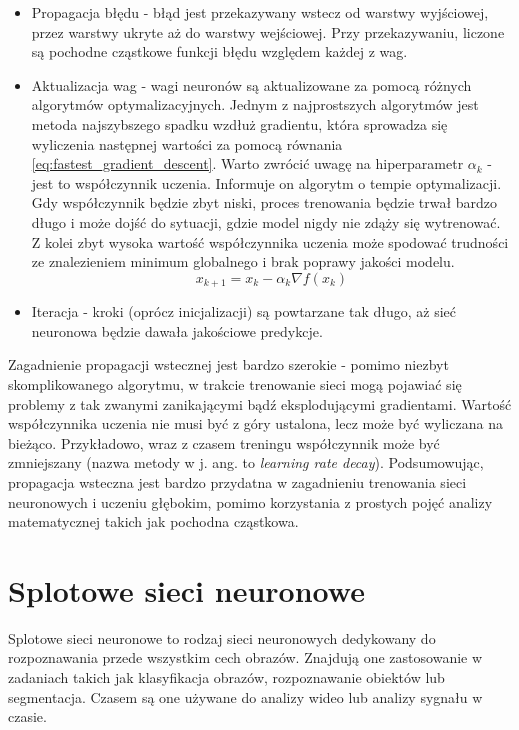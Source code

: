 \begin{itemize}
    \item Propagacja błędu - błąd jest przekazywany wstecz od warstwy wyjściowej, przez warstwy ukryte aż do warstwy wejściowej.
    Przy przekazywaniu, liczone są pochodne cząstkowe funkcji błędu względem każdej z wag.
    \item Aktualizacja wag - wagi neuronów są aktualizowane za pomocą różnych algorytmów optymalizacyjnych.
    Jednym z najprostszych algorytmów jest metoda najszybszego spadku wzdłuż gradientu, która sprowadza się wyliczenia następnej wartości za pomocą równania \ref{eq:fastest_gradient_descent}.
    Warto zwrócić uwagę na hiperparametr $\alpha_k$ - jest to współczynnik uczenia.
    Informuje on algorytm o tempie optymalizacji.
    Gdy współczynnik będzie zbyt niski, proces trenowania będzie trwał bardzo długo i może dojść do sytuacji, gdzie model nigdy nie zdąży się wytrenować.
    Z kolei zbyt wysoka wartość współczynnika uczenia może spodować trudności ze znalezieniem minimum globalnego i brak poprawy jakości modelu.
    \begin{equation}
        x_{k+1} = x_k - \alpha_k \nabla f(x_k)\label{eq:fastest_gradient_descent}
    \end{equation}
    \item Iteracja - kroki (oprócz inicjalizacji) są powtarzane tak długo, aż sieć neuronowa będzie dawała jakościowe predykcje.
\end{itemize}

Zagadnienie propagacji wstecznej jest bardzo szerokie - pomimo niezbyt skomplikowanego algorytmu, w trakcie trenowanie sieci mogą pojawiać się problemy z tak zwanymi zanikającymi bądź eksplodującymi gradientami.
Wartość współczynnika uczenia nie musi być z góry ustalona, lecz może być wyliczana na bieżąco.
Przykładowo, wraz z czasem treningu współczynnik może być zmniejszany (nazwa metody w j. ang. to \textit{learning rate decay}).
Podsumowując, propagacja wsteczna jest bardzo przydatna w zagadnieniu trenowania sieci neuronowych i uczeniu głębokim, pomimo korzystania z prostych pojęć analizy matematycznej takich jak pochodna cząstkowa.


\section{Splotowe sieci neuronowe}

Splotowe sieci neuronowe to rodzaj sieci neuronowych dedykowany do rozpoznawania przede wszystkim cech obrazów.
Znajdują one zastosowanie w zadaniach takich jak klasyfikacja obrazów, rozpoznawanie obiektów lub segmentacja.
Czasem są one używane do analizy wideo lub analizy sygnału w czasie.

